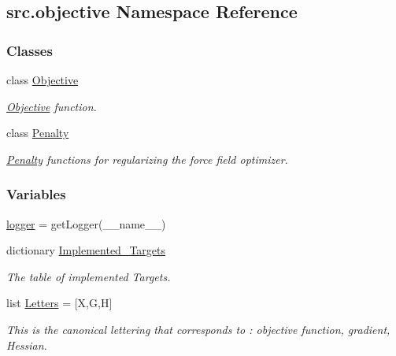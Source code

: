 \hypertarget{namespacesrc_1_1objective}{}\subsection{src.\+objective Namespace Reference}
\label{namespacesrc_1_1objective}
\subsubsection*{Classes}
\begin{DoxyCompactItemize}
\item 
class \hyperlink{classsrc_1_1objective_1_1Objective}{Objective}
\begin{DoxyCompactList}\small\item\em \hyperlink{classsrc_1_1objective_1_1Objective}{Objective} function. \end{DoxyCompactList}\item 
class \hyperlink{classsrc_1_1objective_1_1Penalty}{Penalty}
\begin{DoxyCompactList}\small\item\em \hyperlink{classsrc_1_1objective_1_1Penalty}{Penalty} functions for regularizing the force field optimizer. \end{DoxyCompactList}\end{DoxyCompactItemize}
\subsubsection*{Variables}
\begin{DoxyCompactItemize}
\item 
\hyperlink{namespacesrc_1_1objective_a2e1b3afb7e55f6f759956a7a80782862}{logger} = get\+Logger(\+\_\+\+\_\+name\+\_\+\+\_\+)
\item 
dictionary \hyperlink{namespacesrc_1_1objective_affc0db9b4e7c6a7a3fbc50a2dc9876d9}{Implemented\+\_\+\+Targets}
\begin{DoxyCompactList}\small\item\em The table of implemented Targets. \end{DoxyCompactList}\item 
list \hyperlink{namespacesrc_1_1objective_ab535c4148fea4c974ca148174fdfeb93}{Letters} = \mbox{[}\textquotesingle{}X\textquotesingle{},\textquotesingle{}G\textquotesingle{},\textquotesingle{}H\textquotesingle{}\mbox{]}
\begin{DoxyCompactList}\small\item\em This is the canonical lettering that corresponds to \+: objective function, gradient, Hessian. \end{DoxyCompactList}\end{DoxyCompactItemize}


